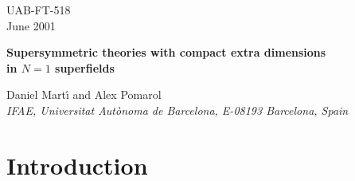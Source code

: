 \documentclass[a4paper,12pt]{article}
\begin{document}
\topmargin -1.0cm
\oddsidemargin -0.8cm
\evensidemargin -0.8cm
\pagestyle{empty}
\begin{flushright}
UAB-FT-518\\
June 2001
\end{flushright}
\vspace*{5mm}

\begin{center}


{\Large\bf 
Supersymmetric theories with compact extra dimensions}\\ 
\vspace*{5mm}
{\Large\bf 
in $N=1$   superfields}\\
\vspace{2.0cm}



{\large Daniel Mart{\'\i} and  Alex Pomarol}\\

\vspace{.6cm}
{\it IFAE, Universitat Aut{\`o}noma de Barcelona, 
E-08193 Barcelona, Spain}
\vspace{.4cm}
\end{center}

\vspace{1cm}
\begin{abstract}
We present an $N=1$ superfield formulation 
of   supersymmetric gauge theories 
with a compact  extra dimension. 
The formulation 
incorporates
the radion superfield and allows to
write
supersymmetric theories
on warped gravitational backgrounds.
We apply it to study the breaking of supersymmetry
by the $F$-term of the radion, and show that,
for  flat extra dimensions,
this leads to 
the same mass spectrum as 
in  Scherk-Schwarz  models of supersymmetry breaking.
We also consider scenarios where supersymmetry
is broken on a boundary of a warped extra dimension
and compare them with anomaly mediated models.
\end{abstract}

\vfill
\begin{flushleft}
\end{flushleft}
\eject
\pagestyle{empty}
\setcounter{page}{1}
\setcounter{footnote}{0}
\pagestyle{plain}



\section{Introduction}
\end{document}
